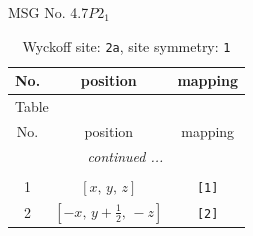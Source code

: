 \documentclass[fleqn,8pt]{jsarticle}
\begin{document}
\setcounter{MaxMatrixCols}{32}

\renewcommand{\tablename}{Table~}
\renewcommand{\figurename}{Figure~}
\begin{center}
\LARGE
MSG No. 4.7\quad$P2_{1}$
\end{center}
\renewcommand{\arraystretch}{1.2}
\begin{longtable}{ccc}
\caption{Wyckoff site: {\tt 2a}, site symmetry: {\tt 1}}
 \\
 \hline \hline
No. & position & mapping \\ \hline \endfirsthead

\multicolumn{2}{l}{\tablename\ \thetable{}} \\
 \hline \hline
No. & position & mapping \\ \hline \endhead

 \hline \hline
\multicolumn{2}{r}{\footnotesize\it continued ...} \\ \endfoot

 \hline \hline
\multicolumn{2}{r}{} \\ \endlastfoot

1 & $\left[ x,\, y,\, z \right]$ & {\tt [1]} \\ \hline
2 & $\left[ - x,\, y + \frac{1}{2},\, - z \right]$ & {\tt [2]} \\
\end{longtable}
\end{document}
